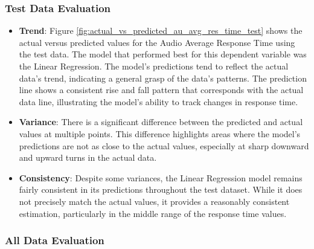 \subsubsection*{Test Data Evaluation}

\begin{itemize}
    \item \textbf{Trend}: Figure \ref{fig:actual_vs_predicted_au_avg_res_time_test} shows the actual versus predicted values for the Audio Average Response Time using the test data. The model that performed
          best for this dependent variable was the Linear Regression. The model's predictions tend to reflect the actual data's trend, indicating a general grasp of the data's patterns. The prediction line shows
          a consistent rise and fall pattern that corresponds with the actual data line, illustrating the model's ability to track changes in response time.

    \item \textbf{Variance}: There is a significant difference between the predicted and actual values at multiple points. This difference highlights areas where the model's predictions 
            are not as close to the actual values, especially at sharp downward and upward turns in the actual data.

    \item \textbf{Consistency}: Despite some variances, the Linear Regression model remains fairly consistent in its predictions throughout the test dataset. While it does not precisely match the actual values, it provides
          a reasonably consistent estimation, particularly in the middle range of the response time values.

\end{itemize}


\subsubsection*{All Data Evaluation}

